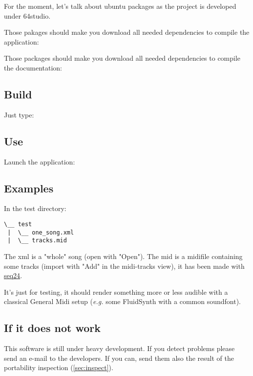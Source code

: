 For the moment, let's talk about ubuntu packages as the project is developed
under 64studio. 

Those pakages should make you download all needed dependencies to compile the
application:


Those packages should make you download all needed dependencies to compile the
documentation:


\subsection{Build}

Just type:


\subsection{Use}

Launch the application:


\subsection{Examples}
In the test directory:

\begin{verbatim}
\__ test
 |  \__ one_song.xml
 |  \__ tracks.mid
\end{verbatim}

The xml is a "whole" song (open with "Open").  The mid is a midifile containing
some tracks (import with "Add" in the midi-tracks view), it has been made with
\href{http://www.filter24.org/seq24/}{seq24}.

It's just for testing, it should render something more or less audible with a
classical General Midi setup (\textit{e.g.} some FluidSynth with a common
soundfont).

\subsection{If it does not work}

This software is still under heavy development. If you detect problems please
send an e-mail to the developers. If you can, send them also the result of the
portability inspection (\ref{sec:inspect}).


